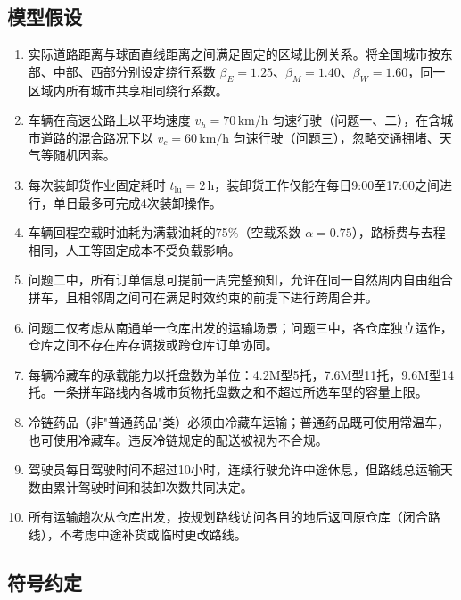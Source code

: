 \subsection{模型假设}

\begin{enumerate}
    \item \label{as:road} 实际道路距离与球面直线距离之间满足固定的区域比例关系。将全国城市按东部、中部、西部分别设定绕行系数 $\beta_E = 1.25$、$\beta_M = 1.40$、$\beta_W = 1.60$，同一区域内所有城市共享相同绕行系数。
    \item \label{as:speed} 车辆在高速公路上以平均速度 $v_h = 70\,\mathrm{km/h}$ 匀速行驶（问题一、二），在含城市道路的混合路况下以 $v_c = 60\,\mathrm{km/h}$ 匀速行驶（问题三），忽略交通拥堵、天气等随机因素。
    \item \label{as:load} 每次装卸货作业固定耗时 $t_{\mathrm{lu}} = 2\,\mathrm{h}$，装卸货工作仅能在每日9:00至17:00之间进行，单日最多可完成4次装卸操作。
    \item \label{as:empty} 车辆回程空载时油耗为满载油耗的75\%（空载系数 $\alpha = 0.75$），路桥费与去程相同，人工等固定成本不受负载影响。
    \item \label{as:week} 问题二中，所有订单信息可提前一周完整预知，允许在同一自然周内自由组合拼车，且相邻周之间可在满足时效约束的前提下进行跨周合并。
    \item \label{as:single} 问题二仅考虑从南通单一仓库出发的运输场景；问题三中，各仓库独立运作，仓库之间不存在库存调拨或跨仓库订单协同。
    \item \label{as:capacity} 每辆冷藏车的承载能力以托盘数为单位：4.2M型5托，7.6M型11托，9.6M型14托。一条拼车路线内各城市货物托盘数之和不超过所选车型的容量上限。
    \item \label{as:cold} 冷链药品（非"普通药品"类）必须由冷藏车运输；普通药品既可使用常温车，也可使用冷藏车。违反冷链规定的配送被视为不合规。
    \item \label{as:driver} 驾驶员每日驾驶时间不超过10小时，连续行驶允许中途休息，但路线总运输天数由累计驾驶时间和装卸次数共同决定。
    \item \label{as:depot} 所有运输趟次从仓库出发，按规划路线访问各目的地后返回原仓库（闭合路线），不考虑中途补货或临时更改路线。
\end{enumerate}


\subsection{符号约定}

